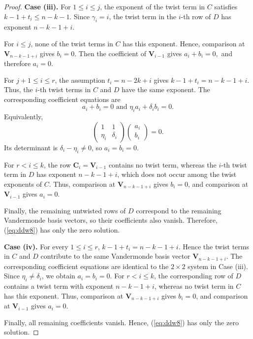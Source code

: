 \documentclass[12pt,draftcls,journal,onecolumn]{IEEEtran}
\begin{document}
\begin{proof}
\medskip
\noindent\textbf{Case (iii).}
For \(1\le i\le j\), the exponent of the twist term in \(C\) satisfies
\(
k-1+t_i\le n-k-1.
\)
Since \(\gamma_i=i\), the twist term in the \(i\)-th row of \(D\) has exponent
\(
n-k-1+i.
\)

For \(i\le j\), none of the twist terms in \(C\) has this exponent. Hence, comparison at \(\mathbf{V}_{n-k-1+i}\) gives
\(
b_i=0.
\)
Then the coefficient of \(\mathbf{V}_{i-1}\) gives
\(
a_i+b_i=0,
\)
and therefore \(a_i=0\).

For \(j+1\le i\le r\), the assumption \(t_i=n-2k+i\) gives
\(
k-1+t_i=n-k-1+i.
\)
Thus, the \(i\)-th twist terms in \(C\) and \(D\) have the same exponent. The corresponding coefficient equations are
\[
a_i+b_i=0 \text{ and } \eta_i a_i+\delta_i b_i=0.
\]
Equivalently,
\[
\begin{pmatrix}
1&1\\
\eta_i&\delta_i
\end{pmatrix}
\begin{pmatrix}
a_i\\
b_i
\end{pmatrix}
=0.
\]
Its determinant is \(\delta_i-\eta_i\ne0\), so \(a_i=b_i=0\).

For \(r<i\le k\), the row
\(
\mathbf{C}_i=\mathbf{V}_{i-1}
\)
contains no twist term, whereas the \(i\)-th twist term in \(D\) has exponent \(n-k-1+i\), which does not occur among the twist exponents of \(C\). Thus, comparison at \(\mathbf{V}_{n-k-1+i}\) gives \(b_i=0\), and comparison at \(\mathbf{V}_{i-1}\) gives \(a_i=0\).

Finally, the remaining untwisted rows of \(D\) correspond to the remaining Vandermonde basis vectors, so their coefficients also vanish. Therefore, (\ref{eq:ddw8}) has only the zero solution.

\medskip
\noindent\textbf{Case (iv).}
For every \(1\le i\le r\),
\(
k-1+t_i=n-k-1+i.
\)
Hence the twist terms in \(C\) and \(D\) contribute to the same Vandermonde basis vector \(\mathbf{V}_{n-k-1+i}\). The corresponding coefficient equations are identical to the \(2\times2\) system in Case (iii). Since \(\eta_i\ne\delta_i\), we obtain
\(
a_i=b_i=0.
\)
For \(r<i\le k\), the corresponding row of \(D\) contains a twist term with exponent \(n-k-1+i\), whereas no twist term in \(C\) has this exponent. Thus, comparison at \(\mathbf{V}_{n-k-1+i}\) gives \(b_i=0\), and comparison at \(\mathbf{V}_{i-1}\) gives \(a_i=0\).

Finally, all remaining coefficients vanish. Hence, (\ref{eq:ddw8}) has only the zero solution.


\end{proof}
\end{document}
